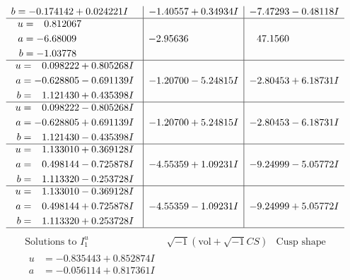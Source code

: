 \documentclass[1p]{elsarticle_modified}
\theoremstyle{definition}
\newcommand{\I}{\sqrt{-1}}
\begin{document}
$$\begin{array}{c|c|c}
\begin{aligned}
b &= -0.174142 + 0.024221 I\end{aligned}
 & -1.40557 + 0.34934 I & -7.47293 - 0.48118 I \\ \hline\begin{aligned}
u &= \phantom{-}0.812067\phantom{ +0.000000I} \\
a &= -6.68009\phantom{ +0.000000I} \\
b &= -1.03778\phantom{ +0.000000I}\end{aligned}
 & -2.95636\phantom{ +0.000000I} & \phantom{-}47.1560\phantom{ +0.000000I} \\ \hline\begin{aligned}
u &= \phantom{-}0.098222 + 0.805268 I \\
a &= -0.628805 - 0.691139 I \\
b &= \phantom{-}1.121430 + 0.435398 I\end{aligned}
 & -1.20700 - 5.24815 I & -2.80453 + 6.18731 I \\ \hline\begin{aligned}
u &= \phantom{-}0.098222 - 0.805268 I \\
a &= -0.628805 + 0.691139 I \\
b &= \phantom{-}1.121430 - 0.435398 I\end{aligned}
 & -1.20700 + 5.24815 I & -2.80453 - 6.18731 I \\ \hline\begin{aligned}
u &= \phantom{-}1.133010 + 0.369128 I \\
a &= \phantom{-}0.498144 - 0.725878 I \\
b &= \phantom{-}1.113320 - 0.253728 I\end{aligned}
 & -4.55359 + 1.09231 I & -9.24999 - 5.05772 I \\ \hline\begin{aligned}
u &= \phantom{-}1.133010 - 0.369128 I \\
a &= \phantom{-}0.498144 + 0.725878 I \\
b &= \phantom{-}1.113320 + 0.253728 I\end{aligned}
 & -4.55359 - 1.09231 I & -9.24999 + 5.05772 I\\
 \hline 
 \end{array}$$\newpage$$\begin{array}{c|c|c}  
\text{Solutions to }I^u_{1}& \I (\text{vol} + \sqrt{-1}CS) & \text{Cusp shape}\\
 \hline 
\begin{aligned}
u &= -0.835443 + 0.852874 I \\
a &= -0.056114 + 0.817361 I \\

\end{aligned}
\end{array}$$
\end{document}
